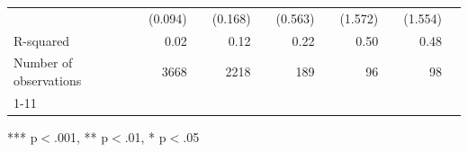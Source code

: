 \documentclass{article}
\begin{document}
\begin{table}[!h]
\begin{tabular}{lllllllllll}
\multicolumn{1}{l}{} &
  \multicolumn{1}{r}{(0.094)} &
  \multicolumn{1}{l}{} &
  \multicolumn{1}{r}{(0.168)} &
  \multicolumn{1}{l}{} &
  \multicolumn{1}{r}{(0.563)} &
  \multicolumn{1}{l}{} &
  \multicolumn{1}{r}{(1.572)} &
  \multicolumn{1}{l}{} &
  \multicolumn{1}{r}{(1.554)} &
  \multicolumn{1}{l}{} \\
\multicolumn{1}{l}{R-squared} &
  \multicolumn{1}{r}{0.02} &
  \multicolumn{1}{l}{} &
  \multicolumn{1}{r}{0.12} &
  \multicolumn{1}{l}{} &
  \multicolumn{1}{r}{0.22} &
  \multicolumn{1}{l}{} &
  \multicolumn{1}{r}{0.50} &
  \multicolumn{1}{l}{} &
  \multicolumn{1}{r}{0.48} &
  \multicolumn{1}{l}{} \\
\multicolumn{1}{l}{Number of observations} &
  \multicolumn{1}{r}{3668} &
  \multicolumn{1}{l}{} &
  \multicolumn{1}{r}{2218} &
  \multicolumn{1}{l}{} &
  \multicolumn{1}{r}{189} &
  \multicolumn{1}{l}{} &
  \multicolumn{1}{r}{96} &
  \multicolumn{1}{l}{} &
  \multicolumn{1}{r}{98} &
  \multicolumn{1}{l}{} \\
\cline{1-11}
\end{tabular}

\footnotesize{
*** p$<$.001, ** p$<$.01, * p$<$.05
}
\end{table}
\end{document}
